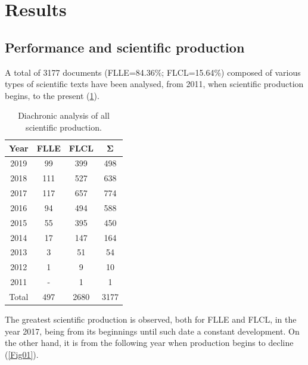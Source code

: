 \documentclass{textolivre-html}
\begin{document}
\section{Results}\label{sec-fmt-results}
\subsection{Performance and scientific production}\label{sec-fmt-performance}
A total of 3177 documents (FLLE=84.36\%; FLCL=15.64\%) composed of various types of scientific texts have been analysed, from 2011, when scientific production begins, to the present (\cref{tbl-tabela-03}).

\begin{table}[htpb]
\caption{Diachronic analysis of all scientific production.}
\label{tbl-tabela-03}
\centering
\begin{tabular}{cccc}
\toprule
\textbf{Year} & \textbf{FLLE} & \textbf{FLCL} & \textbf{Σ} \\ 
\midrule
2019          & 99            & 399           & 498        \\ 
2018          & 111           & 527           & 638        \\ 
2017          & 117           & 657           & 774        \\ 
2016          & 94            & 494           & 588        \\ 
2015          & 55            & 395           & 450        \\ 
2014          & 17            & 147           & 164        \\ 
2013          & 3             & 51            & 54         \\ 
2012          & 1             & 9             & 10         \\ 
2011          & -             & 1             & 1          \\ 
Total         & 497           & 2680          & 3177       \\ 
\bottomrule
\end{tabular}
\end{table}

The greatest scientific production is observed, both for FLLE and FLCL, in the year 2017, being from its beginnings until such date a constant development. On the other hand, it is from the following year when production begins to decline (\cref{Fig01}).
\end{document}
